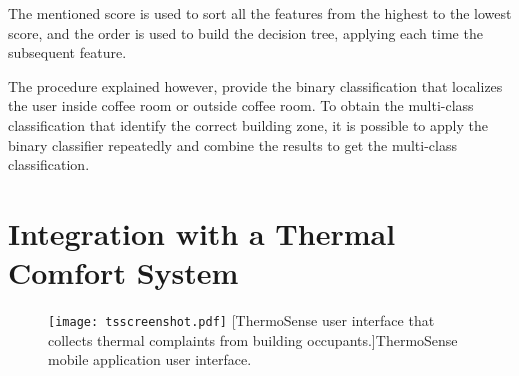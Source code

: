 The mentioned score is used to sort all the features from the highest to the lowest score, and the order is used to build the decision tree, applying each time the subsequent feature.

\smallskip
The procedure explained however, provide the binary classification that localizes the user inside coffee room or outside coffee room. To obtain the multi-class classification that identify the correct building zone, it is possible to apply the binary classifier repeatedly and combine the results to get the multi-class classification.





\section{Integration with a Thermal Comfort System}
\label{sec:thermosense}

\begin{figure}[h!tb]
\center
\texttt{[image: tsscreenshot.pdf]}
[ThermoSense user interface that collects thermal complaints from building occupants.]{ThermoSense mobile application user interface.}
\label{fig:thermoUI}
\end{figure}

